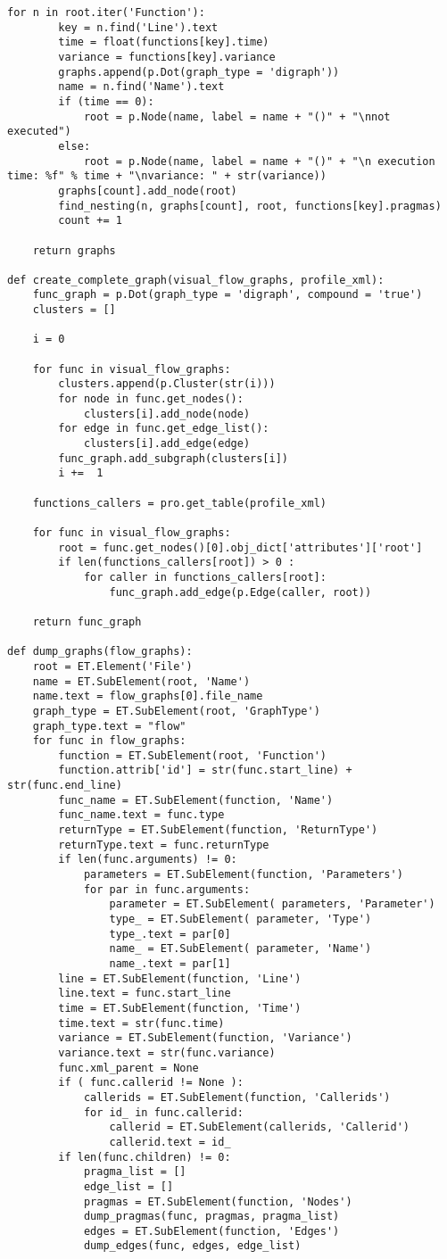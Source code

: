 \documentclass[a4paper,10pt,twoside]{book}
\begin{document}
\begin{lstlisting}[language=CCC, caption=pargraph.py]
	for n in root.iter('Function'):
		key = n.find('Line').text
		time = float(functions[key].time)
		variance = functions[key].variance
		graphs.append(p.Dot(graph_type = 'digraph'))
		name = n.find('Name').text
		if (time == 0):
			root = p.Node(name, label = name + "()" + "\nnot executed")
		else:
			root = p.Node(name, label = name + "()" + "\n execution time: %f" % time + "\nvariance: " + str(variance))
		graphs[count].add_node(root)
		find_nesting(n, graphs[count], root, functions[key].pragmas)
		count += 1

	return graphs

def create_complete_graph(visual_flow_graphs, profile_xml):
	func_graph = p.Dot(graph_type = 'digraph', compound = 'true')
	clusters = []

	i = 0

	for func in visual_flow_graphs:
		clusters.append(p.Cluster(str(i)))
		for node in func.get_nodes():
			clusters[i].add_node(node)
		for edge in func.get_edge_list():
			clusters[i].add_edge(edge)
		func_graph.add_subgraph(clusters[i])
		i +=  1

	functions_callers = pro.get_table(profile_xml)

	for func in visual_flow_graphs:
		root = func.get_nodes()[0].obj_dict['attributes']['root']
		if len(functions_callers[root]) > 0 :
			for caller in functions_callers[root]:
				func_graph.add_edge(p.Edge(caller, root))

	return func_graph

def dump_graphs(flow_graphs):
	root = ET.Element('File')
	name = ET.SubElement(root, 'Name')
	name.text = flow_graphs[0].file_name
	graph_type = ET.SubElement(root, 'GraphType')
	graph_type.text = "flow"
	for func in flow_graphs:
		function = ET.SubElement(root, 'Function')
		function.attrib['id'] = str(func.start_line) + str(func.end_line)
		func_name = ET.SubElement(function, 'Name')
		func_name.text = func.type
		returnType = ET.SubElement(function, 'ReturnType')
		returnType.text = func.returnType
		if len(func.arguments) != 0:
			parameters = ET.SubElement(function, 'Parameters')
			for par in func.arguments:
				parameter = ET.SubElement( parameters, 'Parameter')
				type_ = ET.SubElement( parameter, 'Type')
				type_.text = par[0]
				name_ = ET.SubElement( parameter, 'Name')
				name_.text = par[1]
		line = ET.SubElement(function, 'Line')
		line.text = func.start_line 
		time = ET.SubElement(function, 'Time')
		time.text = str(func.time)
		variance = ET.SubElement(function, 'Variance')
		variance.text = str(func.variance)
		func.xml_parent = None
		if ( func.callerid != None ):
			callerids = ET.SubElement(function, 'Callerids')
			for id_ in func.callerid:
				callerid = ET.SubElement(callerids, 'Callerid')
				callerid.text = id_
		if len(func.children) != 0:
			pragma_list = []
			edge_list = []
			pragmas = ET.SubElement(function, 'Nodes')
			dump_pragmas(func, pragmas, pragma_list)
			edges = ET.SubElement(function, 'Edges')
			dump_edges(func, edges, edge_list)


\end{lstlisting}
\end{document}
